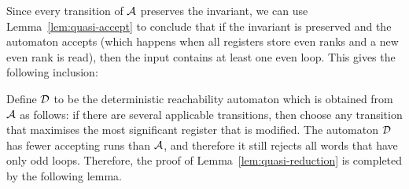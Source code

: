 Since every transition of $\mathcal{A}$ preserves the invariant, we can use   Lemma~\ref{lem:quasi-accept} to conclude  that if the invariant is preserved and the automaton accepts (which happens when all registers store even ranks and a new even rank is read), then the input contains at least one even loop. This gives the following inclusion: 
 
Define $\mathcal{D}$ to be the deterministic reachability automaton which is obtained from $\mathcal{A}$ as follows: if there are several applicable transitions, then choose any transition that maximises the most significant register that is modified. The automaton $\mathcal{D}$ has fewer accepting runs than $\mathcal{A}$, and therefore it still rejects all words that have only odd loops. Therefore, the proof of Lemma~\ref{lem:quasi-reduction} is completed by the following lemma.


